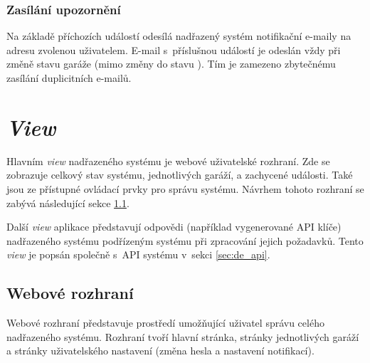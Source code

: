 \subsubsection{Zasílání upozornění}

Na základě příchozích událostí odesílá nadřazený systém notifikační e-maily na adresu zvolenou uživatelem. E-mail s~příslušnou událostí je odeslán vždy při změně stavu garáže (mimo změny do stavu ). Tím je zamezeno zbytečnému zasílání duplicitních e-mailů.




\section{\textit{View}}

Hlavním \textit{view} nadřazeného systému je webové uživatelské rozhraní. Zde se zobrazuje celkový stav systému, jednotlivých garáží, a zachycené události. Také jsou ze přístupné ovládací prvky pro správu systému. Návrhem tohoto rozhraní se zabývá následující sekce \ref{sec:de_web}.

Další \textit{view} aplikace představují odpovědi (například vygenerované API klíče) nadřazeného systému podřízeným systému při zpracování jejich požadavků. Tento \textit{view} je popsán společně s~API systému v~sekci \ref{sec:de_api}.

\subsection{Webové rozhraní}
\label{sec:de_web}

Webové rozhraní představuje prostředí umožňující uživatel správu celého nadřazeného systému. Rozhraní tvoří hlavní stránka, stránky jednotlivých garáží a stránky uživatelského nastavení (změna hesla a nastavení notifikací).

